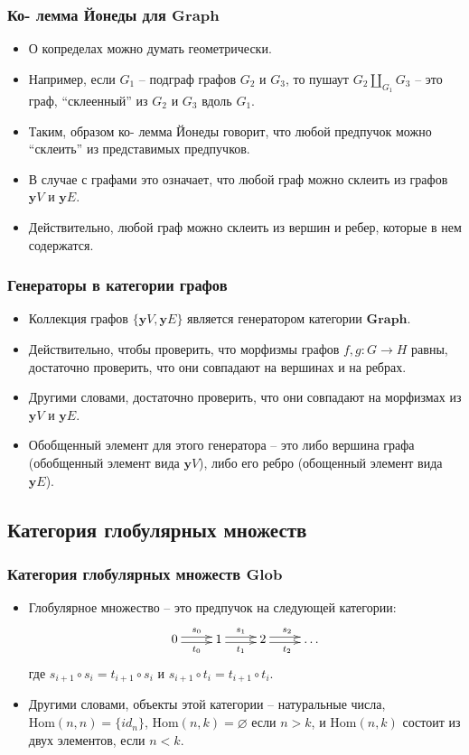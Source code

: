 \documentclass{beamer}
\theoremstyle{definition}
\newcommand{\cat}[1]{\mathbf{#1}}
\newcommand{\y}{\cat{y}}
\newcommand{\Hom}{\mathrm{Hom}}
\begin{document}
\begin{frame}
\frametitle{Ко- лемма Йонеды для $\cat{Graph}$}
\begin{itemize}
\item О копределах можно думать геометрически.
\item Например, если $G_1$ -- подграф графов $G_2$ и $G_3$, то пушаут $G_2 \amalg_{G_1} G_3$ -- это граф, ``склеенный'' из $G_2$ и $G_3$ вдоль $G_1$.
\item Таким, образом ко- лемма Йонеды говорит, что любой предпучок можно ``склеить'' из представимых предпучков.
\item В случае с графами это означает, что любой граф можно склеить из графов $\y V$ и $\y E$.
\item Действительно, любой граф можно склеить из вершин и ребер, которые в нем содержатся.
\end{itemize}
\end{frame}

\begin{frame}
\frametitle{Генераторы в категории графов}
\begin{itemize}
\item Коллекция графов $\{ \y V, \y E \}$ является генератором категории $\cat{Graph}$.
\item Действительно, чтобы проверить, что морфизмы графов $f,g : G \to H$ равны, достаточно проверить, что они совпадают на вершинах и на ребрах.
\item Другими словами, достаточно проверить, что они совпадают на морфизмах из $\y V$ и $\y E$.
\item Обобщенный элемент для этого генератора -- это либо вершина графа (обобщенный элемент вида $\y V$), либо его ребро (обощенный элемент вида $\y E$).
\end{itemize}
\end{frame}

\subsection{Категория глобулярных множеств}

\begin{frame}
\frametitle{Категория глобулярных множеств $\cat{Glob}$}
\begin{itemize}
\item Глобулярное множество -- это предпучок на следующей категории:
\[ \xymatrix{ 0 \ar@<-.5ex>[r]_{t_0} \ar@<.5ex>[r]^{s_0} & 1 \ar@<-.5ex>[r]_{t_1} \ar@<.5ex>[r]^{s_1} & 2 \ar@<-.5ex>[r]_{t_2} \ar@<.5ex>[r]^{s_2} & \ldots } \]
где $s_{i+1} \circ s_i = t_{i+1} \circ s_i$ и $s_{i+1} \circ t_i = t_{i+1} \circ t_i$.
\item Другими словами, объекты этой категории -- натуральные числа, $\Hom(n,n) = \{ id_n \}$, $\Hom(n,k) = \varnothing$ если $n > k$, и $\Hom(n,k)$ состоит из двух элементов, если $n < k$.
\end{itemize}
\end{frame}
\end{document}
